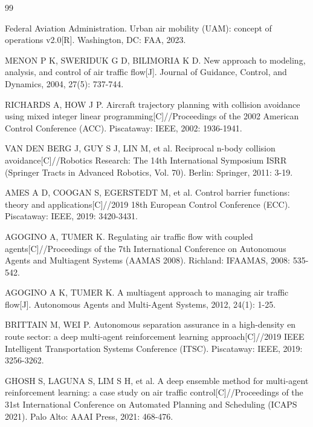 \documentclass[12pt,a4paper,UTF8]{ctexart}
\begin{document}
\begin{thebibliography}{99}

 Federal Aviation Administration. Urban air mobility (UAM): concept of operations v2.0[R]. Washington, DC: FAA, 2023.

 MENON P K, SWERIDUK G D, BILIMORIA K D. New approach to modeling, analysis, and control of air traffic flow[J]. Journal of Guidance, Control, and Dynamics, 2004, 27(5): 737-744.

 RICHARDS A, HOW J P. Aircraft trajectory planning with collision avoidance using mixed integer linear programming[C]//Proceedings of the 2002 American Control Conference (ACC). Piscataway: IEEE, 2002: 1936-1941.

 VAN DEN BERG J, GUY S J, LIN M, et al. Reciprocal n-body collision avoidance[C]//Robotics Research: The 14th International Symposium ISRR (Springer Tracts in Advanced Robotics, Vol. 70). Berlin: Springer, 2011: 3-19.

 AMES A D, COOGAN S, EGERSTEDT M, et al. Control barrier functions: theory and applications[C]//2019 18th European Control Conference (ECC). Piscataway: IEEE, 2019: 3420-3431.

 AGOGINO A, TUMER K. Regulating air traffic flow with coupled agents[C]//Proceedings of the 7th International Conference on Autonomous Agents and Multiagent Systems (AAMAS 2008). Richland: IFAAMAS, 2008: 535-542.

 AGOGINO A K, TUMER K. A multiagent approach to managing air traffic flow[J]. Autonomous Agents and Multi-Agent Systems, 2012, 24(1): 1-25.

 BRITTAIN M, WEI P. Autonomous separation assurance in a high-density en route sector: a deep multi-agent reinforcement learning approach[C]//2019 IEEE Intelligent Transportation Systems Conference (ITSC). Piscataway: IEEE, 2019: 3256-3262.

 GHOSH S, LAGUNA S, LIM S H, et al. A deep ensemble method for multi-agent reinforcement learning: a case study on air traffic control[C]//Proceedings of the 31st International Conference on Automated Planning and Scheduling (ICAPS 2021). Palo Alto: AAAI Press, 2021: 468-476.


\end{thebibliography}
\end{document}
